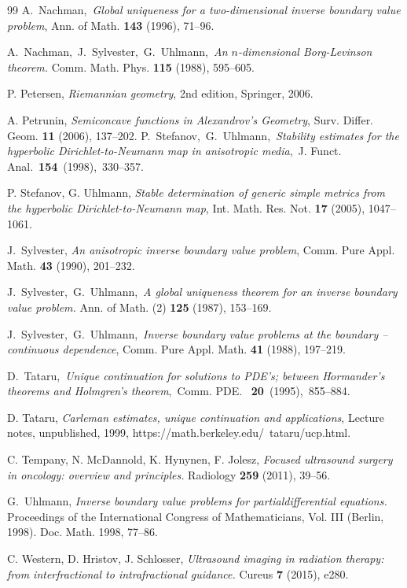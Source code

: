 \documentclass[11pt,letterpaper]{amsart}
\numberwithin{equation}{section}
\theoremstyle{definition}
\theoremstyle{plain}
\theoremstyle{definition}
\theoremstyle{plain}
\theoremstyle{definition}
\theoremstyle{plain}
\begin{document}
\begin{thebibliography}{99}
 A.~Nachman,~\emph{Global uniqueness for a two-dimensional inverse boundary
value problem},
{Ann. of Math.} {\bf 143} (1996),  71--96.

%

A.~Nachman,~J.~Sylvester,~G.~Uhlmann,~\emph{An $n$-dimensional Borg-Levinson theorem.}
Comm. Math. Phys. {\bf 115} (1988), 595--605.
 




 P. Petersen, \emph{Riemannian geometry}, 2nd edition, Springer, 2006.

 A. Petrunin, \emph{Semiconcave functions in Alexandrov's Geometry}, Surv. Differ. Geom. \textbf{11} (2006), 137--202.
 P.~Stefanov,~G.~Uhlmann,~\emph{Stability estimates for the hyperbolic Dirichlet-to-Neumann map in anisotropic media},~J. Funct. Anal.~\textbf{154}~(1998),~330--357.

P. Stefanov, G. Uhlmann, \emph{Stable determination of generic simple metrics from the hyperbolic
Dirichlet-to-Neumann map}, Int. Math. Res. Not. \textbf{17} (2005), 1047--1061.

  J.~Sylvester,
 \emph{An anisotropic inverse boundary value problem}, Comm. Pure Appl. Math. {\bf 43} (1990), 201--232.

  J.~Sylvester,~G.~Uhlmann,~\emph{A global uniqueness theorem for an inverse boundary value problem.}
 Ann. of Math. (2) {\bf 125} (1987), 153--169.
 
   J.~Sylvester,~G.~Uhlmann,~\emph{Inverse boundary value problems at the boundary -- continuous dependence}, Comm. Pure Appl. Math. {\bf 41} (1988), 197--219.
 

 D.~Tataru,~\emph{Unique continuation for solutions to PDE's; between H$\ddot{o}$rmander's theorems and Holmgren's theorem},~Comm. PDE. ~\textbf{20}~(1995),~855--884.

D. Tataru, \emph{Carleman estimates, unique continuation and applications}, Lecture notes, unpublished, 1999, https://math.berkeley.edu/~tataru/ucp.html.


C. Tempany, N. McDannold, K. Hynynen, F. Jolesz,   \emph{Focused ultrasound surgery in oncology: overview and principles.} Radiology {\bf 259} (2011), 39--56. %


G.~Uhlmann, \emph{Inverse boundary value problems for partialdifferential equations.} {Proceedings of the International Congress of Mathematicians,} Vol. III (Berlin,
1998). Doc. Math. 1998, 77--86.

C. Western, D. Hristov, J. Schlosser, \emph{Ultrasound imaging in radiation therapy: from interfractional to intrafractional guidance.} Cureus {\bf 7} (2015), e280. %

\end{thebibliography}
\end{document}
